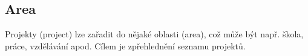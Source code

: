 \subsection{Area}

Projekty (project) lze zařadit do nějaké oblasti (area), což může být např. škola, práce, vzdělávání apod. Cílem je zpřehlednění seznamu projektů.